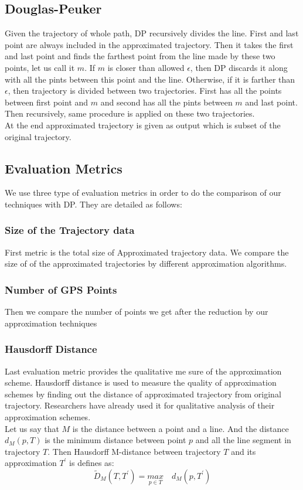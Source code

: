 \documentclass[conference]{IEEEtran}
\begin{document}
 \subsection{Douglas-Peuker}\label{s:dp}
 Given the trajectory of whole path, DP recursively divides the line. First and last point are always included in the approximated trajectory. Then it takes the first and last point and finds the farthest point from the line made by these two points, let us call it $m$. If $m$ is closer than allowed $\epsilon$, then DP discards it along with all the pints between this point and the line. Otherwise, if it is farther than $\epsilon$, then trajectory is divided between two trajectories. First has all the points between first point and $m$ and second has all the pints between $m$ and last point. Then recursively, same procedure is applied on these two trajectories.\\
 At the end approximated trajectory is given as output which is subset of the original trajectory.
 \subsection{Evaluation Metrics}\label{s:evaluation-metrics}
 We use three type of evaluation metrics in order to do the comparison of our techniques with DP. They are detailed as follows:
 \subsubsection{Size of the Trajectory data}
 First metric is the total size of Approximated trajectory data. We compare the size of of the approximated trajectories by different approximation algorithms.
 \subsubsection{Number of GPS Points}
 Then we compare the number of points we get after the reduction by our approximation techniques
 \subsubsection{Hausdorff Distance}
 Last evaluation metric provides the qualitative me sure of the approximation scheme. Hausdorff distance is used to measure the quality of approximation schemes by finding out the distance of approximated trajectory from original trajectory. Researchers have already used it for qualitative analysis of their approximation schemes\cite{Cao:2006:SDR:1147679.1147681}.\\
Let us say that $M$ is the distance between a point and a line. And the distance $d_M(p,T)$ is the minimum distance between point $p$ and all the line segment in trajectory $T$. Then Hausdorff M-distance between trajectory $T$ and its approximation $T^\prime$ is defines as:
\[ { { \tilde { D }  }_{ M }(T,T^\prime ) }={ \underset { p\in T }{ max }  }\quad { d }_{ M }(p,T^\prime )\]
\end{document}

